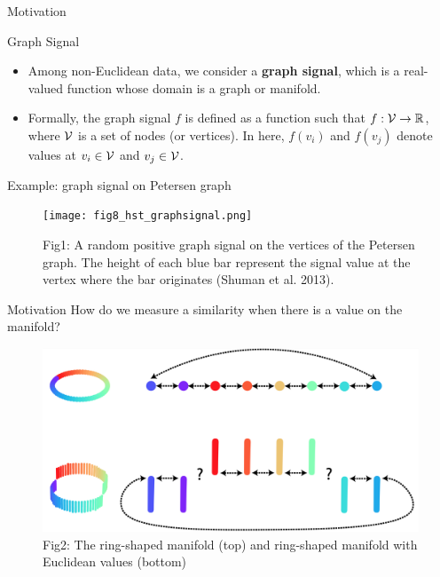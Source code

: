 \documentclass[
  ignorenonframetext,
]{beamer}
\providecommand{\tightlist}{%
  \setlength{\itemsep}{0pt}\setlength{\parskip}{0pt}}\usepackage{longtable,booktabs,array}
\begin{document}
\begin{frame}{Motivation}
\label{motivation-1}
\begin{block}{Graph Signal}
\begin{itemize}
\tightlist
\item
  Among non-Euclidean data, we consider a \textbf{graph signal}, which
  is a real-valued function whose domain is a graph or manifold.
\item
  Formally, the graph signal \(f\) is defined as a function such that
  \(f:{\cal V} \to \mathbb{R}\), where \({\cal V}\) is a set of nodes
  (or vertices). In here, \(f(v_i)\) and \(f(v_j)\) denote values at
  \(v_i\in {\cal V}\) and \(v_j\in {\cal V}\).
\end{itemize}
\end{block}

\begin{block}{Example: graph signal on Petersen graph}
\begin{figure}[H]

{\centering \texttt{[image: fig8\_hst\_graphsignal.png]}

}

\caption{Fig1: A random positive graph signal on the vertices of the
Petersen graph. The height of each blue bar represent the signal value
at the vertex where the bar originates (Shuman et al. 2013).}

\end{figure}%
\end{block}
\end{frame}

\begin{frame}{Motivation}
\label{motivation-2}
How do we measure a similarity when there is a value on the manifold?

\begin{figure}[H]

{\centering \includegraphics{Beamer_files/figure-beamer/bf181b9a-e50e-43ac-aa62-4f8c35b60cc0-1-740fdc07-677d-4d79-8f84-1506459bb231.png}

}

\caption{Fig2: The ring-shaped manifold (top) and ring-shaped manifold
with Euclidean values (bottom)}

\end{figure}%
\end{frame}
\end{document}
